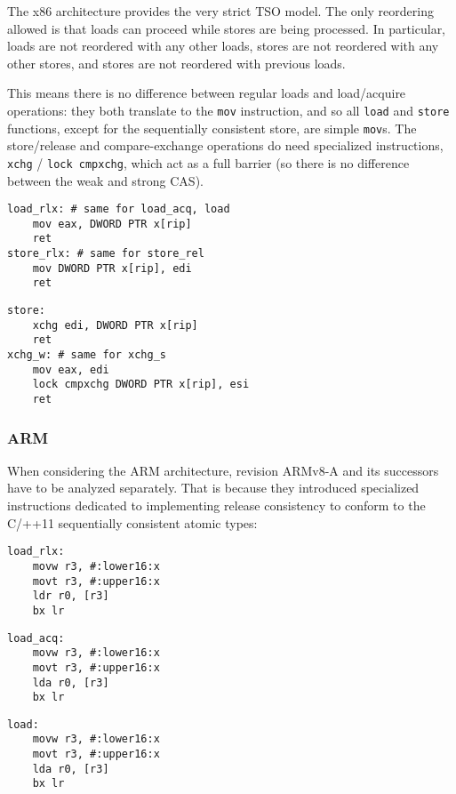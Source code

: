 The x86 architecture provides the very strict TSO model.  The only reordering
allowed is that loads can proceed while stores are being processed.  In
particular, loads are not reordered with any other loads, stores are not
reordered with any other stores, and stores are not reordered with previous
loads.

This means there is no difference between regular loads and load/acquire
operations: they both translate to the \texttt{mov} instruction, and so all
\texttt{load} and \texttt{store} functions, except for the sequentially
consistent store, are simple \texttt{mov}s.  The store/release and
compare-exchange operations do need specialized instructions, \texttt{xchg} /
\texttt{lock cmpxchg}, which act as a full barrier (so there is no difference
between the weak and strong CAS).

\begin{multicols}{2}
    \begin{lstlisting}[style=x86,xleftmargin=0px,xrightmargin=0px]
load_rlx: # same for load_acq, load
    mov eax, DWORD PTR x[rip]
    ret
store_rlx: # same for store_rel
    mov DWORD PTR x[rip], edi
    ret
    \end{lstlisting}
    \columnbreak
    \begin{lstlisting}[style=x86,xleftmargin=0px,xrightmargin=0px]
store:
    xchg edi, DWORD PTR x[rip]
    ret
xchg_w: # same for xchg_s
    mov eax, edi
    lock cmpxchg DWORD PTR x[rip], esi
    ret
    \end{lstlisting}
\end{multicols}

\subsubsection{ARM}

When considering the ARM architecture, revision ARMv8-A and its successors have
to be analyzed separately.  That is because they introduced specialized
instructions dedicated to implementing release consistency to conform to the
C/++11 sequentially consistent atomic types:

\begin{multicols}{3}
    \begin{lstlisting}[style=arm,xleftmargin=0px,xrightmargin=0px]
load_rlx:
    movw r3, #:lower16:x
    movt r3, #:upper16:x
    ldr r0, [r3]
    bx lr
    \end{lstlisting}
    \columnbreak
    \begin{lstlisting}[style=arm,xleftmargin=0px,xrightmargin=0px]
load_acq:
    movw r3, #:lower16:x
    movt r3, #:upper16:x
    lda r0, [r3]
    bx lr
    \end{lstlisting}
    \columnbreak
    \begin{lstlisting}[style=arm,xleftmargin=0px,xrightmargin=0px]
load:
    movw r3, #:lower16:x
    movt r3, #:upper16:x
    lda r0, [r3]
    bx lr
    \end{lstlisting}
\end{multicols}

